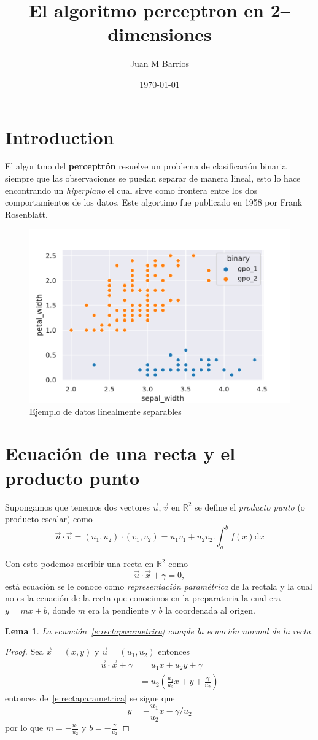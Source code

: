 \documentclass{article}
\title{El algoritmo perceptron en 2--dimensiones}
\author{Juan M Barrios}
\date{\today}
\newtheorem{lema}{Lema}
\newcommand{\RR}{\mathbb{R}}
\newcommand{\dd}[1]{\textrm{d}#1}
\begin{document}
\maketitle

\section{Introduction}

El algoritmo del \textbf{perceptrón} resuelve un problema de clasificación binaria siempre que las observaciones
se puedan separar de manera lineal, esto lo hace encontrando un \emph{hiperplano} el cual sirve como frontera 
entre los dos comportamientos de los datos. Este algortimo fue publicado en 1958 por Frank Rosenblatt.

\begin{figure}
    \centering
    \includegraphics[width=.5\textwidth]{./imgs/plotdata}
    \caption{Ejemplo de datos linealmente separables}
    \label{fig:plotdata}
\end{figure}

\section{Ecuación de una recta y el producto punto}
Supongamos que tenemos dos vectores $\vec{u}, \vec{v}$ en $\RR^2$ se define el \emph{producto punto} (o producto 
escalar) como
$$
\vec{u}\cdot\vec{v} = (u_1, u_2)\cdot(v_1, v_2) = u_1v_1 + u_2v_2. \int_a^bf(x)\dd{x}
$$

Con esto podemos escribir una recta en $\RR^2$ como 
\begin{equation}\label{e:rectaparametrica}
    \vec{u}\cdot\vec{x} + \gamma = 0,
\end{equation}
está ecuación se le conoce como \emph{representación paramétrica} de la rectala y la cual no es la 
ecuación de la recta que conocimos en la preparatoria la cual era $y=mx+b$, donde $m$ era la  pendiente 
y $b$ la coordenada al origen.

\begin{lema}
La ecuación~\ref{e:rectaparametrica} cumple la ecuación normal de la recta.
\end{lema}
\begin{proof}
Sea $\vec{x} = (x, y)$ y $\vec{u}=(u_1, u_2)$ entonces 
\begin{align*}
    \vec{u}\cdot\vec{x} + \gamma &= u_1x + u_2y + \gamma\\
                        &= u_2(\frac{u_1}{u_2}x + y + \frac{\gamma}{u_2})
\end{align*}
entonces de~\eqref{e:rectaparametrica} se sigue que 
$$
    y = -\frac{u_1}{u_2}x - \gamma/u_2
$$
por lo que $m=-\frac{u_1}{u_2}$ y $b=-\frac{\gamma}{u_2}$
\end{proof}
\end{document}

